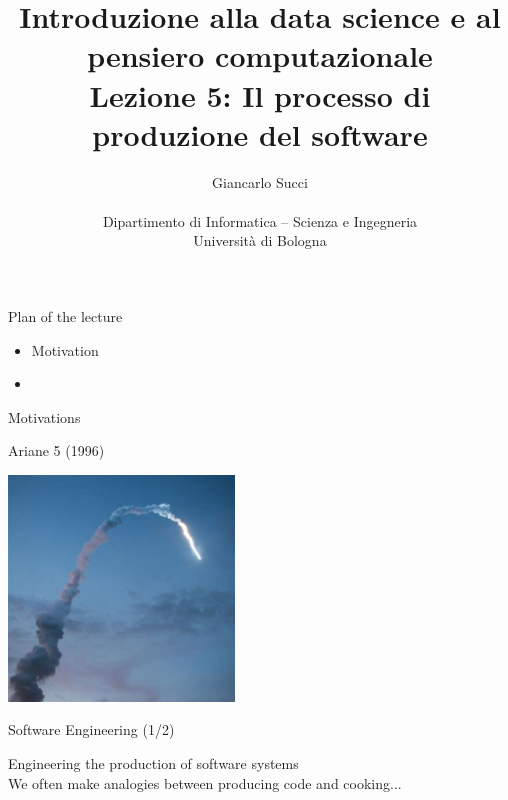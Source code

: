 \documentclass{beamer}
\title[L02]{Introduzione alla data science e al pensiero computazionale\\
Lezione 5: Il processo di produzione del software} %
\author[{\tiny Giancarlo Succi }]{Giancarlo Succi\\\\ Dipartimento di Informatica -- Scienza e Ingegneria\\Universit\`{a} di Bologna\\
\bftt{g.succi@unibo.it}
} %
\institute[unibo] %
\date{} %
\begin{document}
\begin{frame}
\titlepage %

\end{frame}




\begin{frame}
{\centerline{Plan of the lecture}}
\begin{itemize}
    \item Motivation
    \item 
\end{itemize} 
\end{frame}

\begin{frame}{\centerline{Motivations}}
\begin{center}
{\Large
Ariane 5 (1996)\\
}
\end{center}
\begin{center}
\includegraphics[width=60mm]{A2022.IDSEPC.ProcessoDiProduzione/Ariane5.jpeg}
\end{center}

\end{frame}



\begin{frame}{\centerline{Software Engineering (1/2)}}
\begin{center}
{\Large
Engineering the production of software systems\\
}
\vspace{2cm}
We often make analogies between producing code and cooking...
\end{center}
\end{frame}
\end{document}
